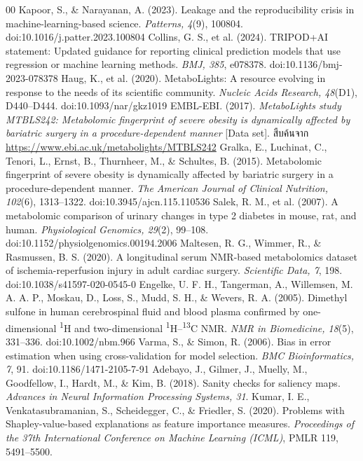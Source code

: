 \documentclass[11pt,a4paper]{article}
\begin{document}
\begin{thebibliography}{00}
 Kapoor, S., \& Narayanan, A. (2023). Leakage and the reproducibility crisis in machine-learning-based science. \textit{Patterns, 4}(9), 100804. doi:10.1016/j.patter.2023.100804
 Collins, G. S., et al. (2024). TRIPOD+AI statement: Updated guidance for reporting clinical prediction models that use regression or machine learning methods. \textit{BMJ, 385}, e078378. doi:10.1136/bmj-2023-078378
 Haug, K., et al. (2020). MetaboLights: A resource evolving in response to the needs of its scientific community. \textit{Nucleic Acids Research, 48}(D1), D440--D444. doi:10.1093/nar/gkz1019
 EMBL-EBI. (2017). \textit{MetaboLights study MTBLS242: Metabolomic fingerprint of severe obesity is dynamically affected by bariatric surgery in a procedure-dependent manner} [Data set]. สืบค้นจาก \url{https://www.ebi.ac.uk/metabolights/MTBLS242}
 Gralka, E., Luchinat, C., Tenori, L., Ernst, B., Thurnheer, M., \& Schultes, B. (2015). Metabolomic fingerprint of severe obesity is dynamically affected by bariatric surgery in a procedure-dependent manner. \textit{The American Journal of Clinical Nutrition, 102}(6), 1313--1322. doi:10.3945/ajcn.115.110536
 Salek, R. M., et al. (2007). A metabolomic comparison of urinary changes in type 2 diabetes in mouse, rat, and human. \textit{Physiological Genomics, 29}(2), 99--108. doi:10.1152/physiolgenomics.00194.2006
 Maltesen, R. G., Wimmer, R., \& Rasmussen, B. S. (2020). A longitudinal serum NMR-based metabolomics dataset of ischemia-reperfusion injury in adult cardiac surgery. \textit{Scientific Data, 7}, 198. doi:10.1038/s41597-020-0545-0
 Engelke, U. F. H., Tangerman, A., Willemsen, M. A. A. P., Moskau, D., Loss, S., Mudd, S. H., \& Wevers, R. A. (2005). Dimethyl sulfone in human cerebrospinal fluid and blood plasma confirmed by one-dimensional \textsuperscript{1}H and two-dimensional \textsuperscript{1}H--\textsuperscript{13}C NMR. \textit{NMR in Biomedicine, 18}(5), 331--336. doi:10.1002/nbm.966
 Varma, S., \& Simon, R. (2006). Bias in error estimation when using cross-validation for model selection. \textit{BMC Bioinformatics, 7}, 91. doi:10.1186/1471-2105-7-91
 Adebayo, J., Gilmer, J., Muelly, M., Goodfellow, I., Hardt, M., \& Kim, B. (2018). Sanity checks for saliency maps. \textit{Advances in Neural Information Processing Systems, 31}.
 Kumar, I. E., Venkatasubramanian, S., Scheidegger, C., \& Friedler, S. (2020). Problems with Shapley-value-based explanations as feature importance measures. \textit{Proceedings of the 37th International Conference on Machine Learning (ICML)}, PMLR 119, 5491--5500.
\end{thebibliography}
\endgroup
\end{document}
